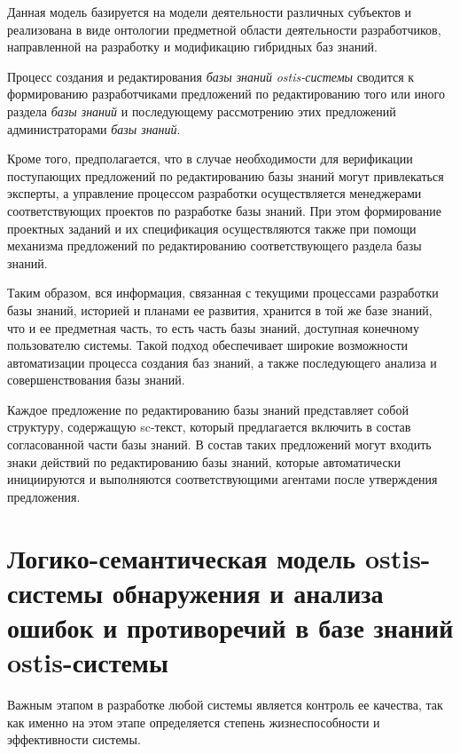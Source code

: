Данная модель базируется на модели деятельности различных субъектов и реализована в виде онтологии предметной области деятельности разработчиков, направленной на разработку и модификацию гибридных баз знаний.

Процесс создания и редактирования \textit{базы знаний} \textit{ostis-системы} сводится к формированию разработчиками предложений по редактированию того или иного раздела \textit{базы знаний} и последующему рассмотрению этих предложений администраторами \textit{базы знаний}.

Кроме того, предполагается, что в случае необходимости для верификации поступающих предложений по редактированию базы знаний могут привлекаться эксперты, а управление процессом разработки осуществляется менеджерами соответствующих проектов по разработке базы знаний.
При этом формирование проектных заданий и их спецификация осуществляются также при помощи механизма предложений по редактированию соответствующего раздела базы знаний.

Таким образом, вся информация, связанная с текущими процессами разработки базы знаний, историей и планами ее развития, хранится в той же базе знаний, что и ее предметная часть, то есть часть базы знаний, доступная конечному пользователю системы. Такой подход обеспечивает широкие возможности автоматизации процесса создания баз знаний, а также последующего анализа и совершенствования базы знаний.

Каждое предложение по редактированию базы знаний представляет собой структуру, содержащую sc-текст, который предлагается включить в состав согласованной части базы знаний. В состав таких предложений могут входить знаки действий по редактированию базы знаний, которые автоматически инициируются и выполняются соответствующими агентами после утверждения предложения.

\section{Логико-семантическая модель ostis-системы обнаружения и анализа ошибок и противоречий в базе знаний ostis-системы}
\label{sec_kb_design_contradiction}

Важным этапом в разработке любой системы является контроль ее качества, так как именно на этом этапе определяется степень жизнеспособности и эффективности системы.

